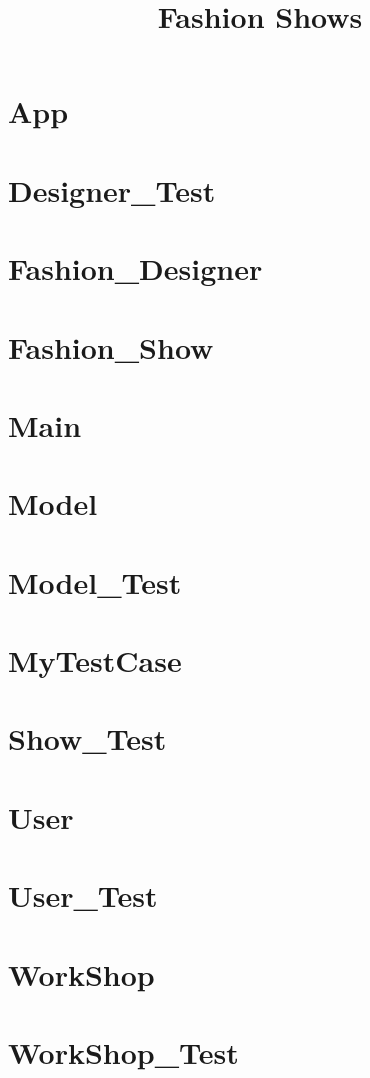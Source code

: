 \documentclass{article}
\begin{document}
\title{Fashion Shows}
\author{}
\maketitle
\tableofcontents

\section{App}

\section{Designer\_Test}

\section{Fashion\_Designer}

\section{Fashion\_Show}

\section{Main}

\section{Model}

\section{Model\_Test}

\section{MyTestCase}

\section{Show\_Test}

\section{User}

\section{User\_Test}

\section{WorkShop}

\section{WorkShop\_Test}

\end{document}
